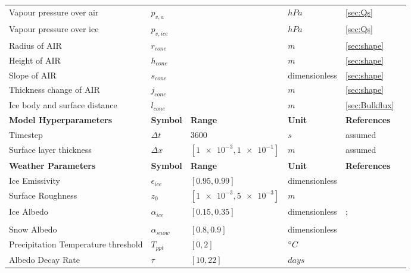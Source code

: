 \documentclass[utf8]{frontiersSCNS}
\begin{document}
\begin{table}[h!]
\begin{tabular}{@{}llllll@{}}
    Vapour pressure over air & $p_{v,a}$ &  & $hPa$  & \ref{sec:Qs}\\
    Vapour pressure over ice & $p_{v,ice}$ &  & $hPa$ & \ref{sec:Qs}\\
    Radius of AIR & $r_{cone}$ &  & $m$ & \ref{sec:shape}\\
    Height of AIR & $h_{cone}$ &  & $m$ & \ref{sec:shape}\\
    Slope of AIR  & $s_{cone}$ &  & dimensionless & \ref{sec:shape}\\
    Thickness change of AIR  & $j_{cone}$ &  & $m$  & \ref{sec:shape}\\
    Ice body and surface distance & $l_{cone}$ &  & $m$  & \ref{sec:Bulkflux}\\
\midrule
		\textbf{Model Hyperparameters} & \textbf{Symbol} & \textbf{Range} & \textbf{Unit} & \textbf{References} \\\midrule
    Timestep                            & $\Delta t$            & $3600$           & $s$ & assumed \\
    Surface layer thickness             & $\Delta x$            & $[\num{1e-3},\num{1e-1}]$           & $m$ & assumed
    \\\midrule
		\textbf{Weather Parameters} & \textbf{Symbol} & \textbf{Range} & \textbf{Unit} & \textbf{References} \\\midrule
    Ice Emissivity                      & $\epsilon_{ice}$      & $[0.95,0.99]$         & dimensionless & \citeauthor{HORI2006486}             \\
    Surface Roughness                   & $z_0$                 & $[\num{1e-3},\num{5e-3}]$            & $m$  & \citeauthor{BrockWillisSharp_2006}       \\
    Ice Albedo                          & $\alpha_{ice}$        & $[0.15,0.35]$         & dimensionless  &
    \citeauthor{steiner_2015};            \\
    & &    &  & \citeauthor{ZollesMaussion_2019}      \\
    Snow Albedo                         & $\alpha_{snow}$       & $[0.8,0.9]$        & dimensionless  & \citeauthor{ZollesMaussion_2019}              \\
    Precipitation Temperature threshold & $T_{ppt}$             & $[0,2]$            & $\degree C$& \citeauthor{Zhou_2010}  \\
    Albedo Decay Rate                   & $\tau$                & $[10,22]$           & $days$ &

\end{tabular}
\end{table}
\end{document}
